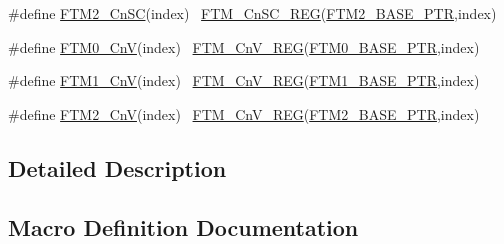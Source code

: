 \begin{DoxyCompactItemize}
\item 
\#define \hyperlink{group___f_t_m___register___accessor___macros_gae283505ba41ed3c3212632a3d646ee31}{F\+T\+M2\+\_\+\+Cn\+SC}(index)                                              ~\hyperlink{group___f_t_m___register___accessor___macros_ga49332bccc11dd36d399f3fff66f313b5}{F\+T\+M\+\_\+\+Cn\+S\+C\+\_\+\+R\+EG}(\hyperlink{group___f_t_m___peripheral_ga897564efeaf1be1f991305d294eda3d6}{F\+T\+M2\+\_\+\+B\+A\+S\+E\+\_\+\+P\+TR},index)
\item 
\#define \hyperlink{group___f_t_m___register___accessor___macros_gafa3100e71e0145e36d896e8061a931ad}{F\+T\+M0\+\_\+\+CnV}(index)                                                ~\hyperlink{group___f_t_m___register___accessor___macros_gaacf8fed24da463653900319184874197}{F\+T\+M\+\_\+\+Cn\+V\+\_\+\+R\+EG}(\hyperlink{group___f_t_m___peripheral_gae712c29b7abcf338d8f8f6418683fa66}{F\+T\+M0\+\_\+\+B\+A\+S\+E\+\_\+\+P\+TR},index)
\item 
\#define \hyperlink{group___f_t_m___register___accessor___macros_ga24fb80c2d6dbb122dce1c2eebe041d1d}{F\+T\+M1\+\_\+\+CnV}(index)                                                ~\hyperlink{group___f_t_m___register___accessor___macros_gaacf8fed24da463653900319184874197}{F\+T\+M\+\_\+\+Cn\+V\+\_\+\+R\+EG}(\hyperlink{group___f_t_m___peripheral_ga38115fba8eadfc94b2fc411f45906002}{F\+T\+M1\+\_\+\+B\+A\+S\+E\+\_\+\+P\+TR},index)
\item 
\#define \hyperlink{group___f_t_m___register___accessor___macros_gaade79f672ad080d530a40665a662cd0f}{F\+T\+M2\+\_\+\+CnV}(index)                                                ~\hyperlink{group___f_t_m___register___accessor___macros_gaacf8fed24da463653900319184874197}{F\+T\+M\+\_\+\+Cn\+V\+\_\+\+R\+EG}(\hyperlink{group___f_t_m___peripheral_ga897564efeaf1be1f991305d294eda3d6}{F\+T\+M2\+\_\+\+B\+A\+S\+E\+\_\+\+P\+TR},index)
\end{DoxyCompactItemize}


\subsection{Detailed Description}


\subsection{Macro Definition Documentation}
